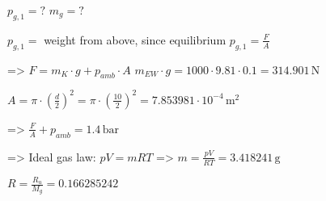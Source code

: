\( p_{g,1} = ? \) \( m_g = ? \)  

\( p_{g,1} = \) weight from above, since equilibrium  
\( p_{g,1} = \frac{F}{A} \)  

=> \( F = m_K \cdot g + p_{amb} \cdot A \)  
\( m_{EW} \cdot g = 1000 \cdot 9.81 \cdot 0.1 = 314.901 \, \text{N} \)  

\( A = \pi \cdot \left(\frac{d}{2}\right)^2 = \pi \cdot \left(\frac{10}{2}\right)^2 = 7.853981 \cdot 10^{-4} \, \text{m}^2 \)  

=> \( \frac{F}{A} + p_{amb} = 1.4 \, \text{bar} \)  

=> Ideal gas law:  
\( pV = mRT \) => \( m = \frac{pV}{RT} = 3.418241 \, \text{g} \)  

\( R = \frac{R_u}{M_g} = 0.166285242 \)